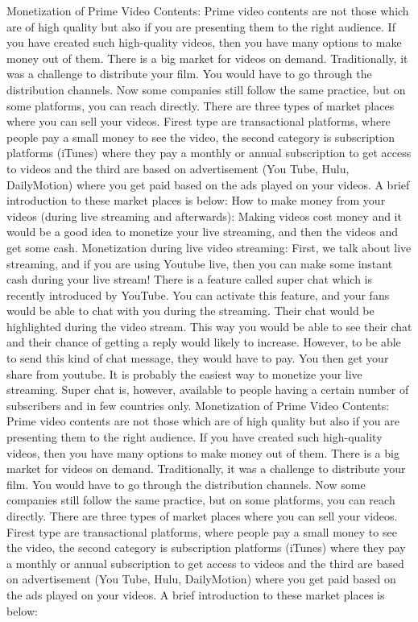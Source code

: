 \documentclass{book}
\begin{document}
Monetization of Prime Video Contents:
Prime video contents are not those which are of high quality but also if you are presenting them to the right audience.  If you have created such high-quality videos, then you have many options to make money out of them.  There is a big market for videos on demand. Traditionally, it was a challenge to distribute your film. You would have to go through the distribution channels. Now some companies still follow the same practice, but on some platforms, you can reach directly. There are three types of market places where you can sell your videos. Firest type are transactional platforms, where people pay a small money to see the video, the second category is subscription platforms (iTunes) where they pay a monthly or annual subscription to get access to videos and the third are based on advertisement (You Tube, Hulu, DailyMotion) where you get paid based on the ads played on your videos. A brief introduction to these market places is below:
How to make money from your videos (during live streaming and afterwards):
Making videos cost money and it would be a good idea to monetize your live streaming, and then the videos and get some cash.
Monetization during live video streaming:
First, we talk about live streaming, and if you are using Youtube live, then you can make some instant cash during your live stream! There is a feature called super chat which is recently introduced by YouTube.  You can activate this feature, and your fans would be able to chat with you during the streaming. Their chat would be highlighted during the video stream. This way you would be able to see their chat and their chance of getting a reply would likely to increase. However,  to be able to send this kind of chat message, they would have to pay.  You then get your share from youtube. It is probably the easiest way to monetize your live streaming. Super chat is, however, available to people having a certain number of subscribers and in few countries only.
Monetization of Prime Video Contents:
Prime video contents are not those which are of high quality but also if you are presenting them to the right audience.  If you have created such high-quality videos, then you have many options to make money out of them.  There is a big market for videos on demand. Traditionally, it was a challenge to distribute your film. You would have to go through the distribution channels. Now some companies still follow the same practice, but on some platforms, you can reach directly. There are three types of market places where you can sell your videos. Firest type are transactional platforms, where people pay a small money to see the video, the second category is subscription platforms (iTunes) where they pay a monthly or annual subscription to get access to videos and the third are based on advertisement (You Tube, Hulu, DailyMotion) where you get paid based on the ads played on your videos. A brief introduction to these market places is below:
\end{document}
